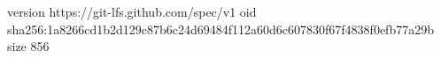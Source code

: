 version https://git-lfs.github.com/spec/v1
oid sha256:1a8266cd1b2d129c87b6c24d69484f112a60d6c607830f67f4838f0efb77a29b
size 856
